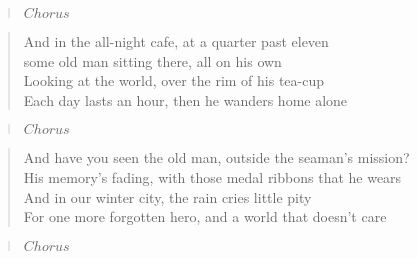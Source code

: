 \documentclass[9pt,a4paper,oneside, onecolumn]{article}
\begin{document}
\begin{verse}
$Chorus$
\end{verse}

\begin{verse}
And in the all-night cafe, at a quarter past eleven\\
some old man sitting there, all on his own\\
Looking at the world, over the rim of his tea-cup\\
Each day lasts an hour, then he wanders home alone\\
\end{verse}

\begin{verse}
$Chorus$
\end{verse}

\begin{verse}
And have you seen the old man, outside the seaman's mission?\\
His memory's fading, with those medal ribbons that he wears\\
And in our winter city, the rain cries little pity\\
For one more forgotten hero, and a world that doesn't care\\
\end{verse}

\begin{verse}
$Chorus$
\end{verse}
\end{document}
